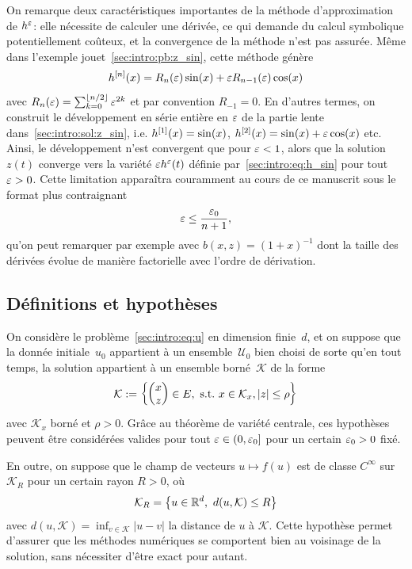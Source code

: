On remarque deux caractéristiques importantes de la méthode d'approximation de $h^{\varepsilon}$: elle nécessite de calculer une dérivée, ce qui demande du calcul symbolique potentiellement coûteux, et la convergence de la méthode n'est pas assurée. Même dans l'exemple jouet~\eqref{sec:intro:pb:z_sin}, cette méthode génère
\begin{equation*}
    h^{[n]}(x) = R_n(\varepsilon) \sin(x) + \varepsilon R_{n-1}(\varepsilon) \cos(x) 
\end{equation*}
avec $R_n(\varepsilon) = \sum_{k = 0}^{\left\lfloor n/2 \right\rfloor} \varepsilon^{2k}$ et par convention $R_{-1} = 0$. En d'autres termes, on construit le développement en série entière en $\varepsilon$ de la partie lente dans~\eqref{sec:intro:sol:z_sin}, i.e. $h^{[1]}(x) = \sin(x)$, $h^{[2]} (x) = \sin(x) + \varepsilon \cos(x)$ etc. Ainsi, le développement n'est convergent que pour $\varepsilon < 1$, alors que la solution $z(t)$ converge vers la variété $\varepsilon h^{\varepsilon}(t)$ définie par~\eqref{sec:intro:eq:h_sin} pour tout $\varepsilon > 0$. 
%
Cette limitation apparaîtra couramment au cours de ce manuscrit sous le format plus contraignant
\begin{equation*}
    \varepsilon \leq \frac{\varepsilon_0}{n+1} ,
\end{equation*}
qu'on peut remarquer par exemple avec $b(x,z) = (1+x)^{-1}$ dont la taille des dérivées évolue de manière factorielle avec l'ordre de dérivation. 




\subsection*{Définitions et hypothèses}


On considère le problème~\eqref{sec:intro:eq:u} en dimension finie~$d$, et on suppose que la donnée initiale~$u_0$ appartient à un ensemble~$\mathcal{U}_0$ bien choisi de sorte qu'en tout temps, la solution appartient à un ensemble borné~$\mathcal{K}$ de la forme
\begin{equation*}
    \mathcal{K} := \left\{ \begin{pmatrix} x \\ z \end{pmatrix} \in E,\ \mathrm{s.t.}\ x \in \mathcal{K}_x, |z| \leq \rho  \right\} 
\end{equation*}
avec $\mathcal{K}_x$ borné et $\rho > 0$. Grâce au théorème de variété centrale, ces hypothèses peuvent être considérées valides pour tout $\varepsilon \in (0, \varepsilon_0]$ pour un certain $\varepsilon_0 > 0$ fixé. 

En outre, on suppose que le champ de vecteurs $u \mapsto f(u)$ est de classe $C^\infty$ sur $\mathcal{K}_R$ pour un certain rayon $R > 0$, où
\begin{equation*}
    \mathcal{K}_R = \left\lbrace u \in \mathbb{R}^d,\ d(u, \mathcal{K}) \leq R \right\rbrace 
\end{equation*} 
avec $d(u, \mathcal{K}) = \inf_{v \in \mathcal{K}} |u-v|$ la distance de $u$ à $\mathcal{K}$. Cette hypothèse permet d'assurer que les méthodes numériques se comportent bien au voisinage de la solution, sans nécessiter d'être exact pour autant. 